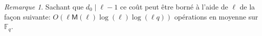 \documentclass[10pt,a4paper]{book}
\theoremstyle{plain}
\theoremstyle{definition}
\theoremstyle{definition}
\theoremstyle{definition}
\theoremstyle{definition}
\theoremstyle{remark}
\newtheorem{rem}[thm]{Remarque}
\theoremstyle{remark}
\theoremstyle{definition}
\begin{document}
 
\begin{rem}
Sachant que $d_0 \mid \ell-1$ ce coût peut être borné à l'aide de $\ell$ de la façon suivante: $O(\ell\mathsf{M}(\ell)\log(\ell)\log(\ell q))$ opérations en moyenne sur $\mathbb{F}_q$.
\end{rem}
 
\end{document}
